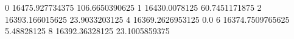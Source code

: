 0 16475.927734375 106.6650390625
1 16430.0078125 60.7451171875
2 16393.166015625 23.9033203125
4 16369.2626953125 0.0
6 16374.7509765625 5.48828125
8 16392.36328125 23.1005859375
